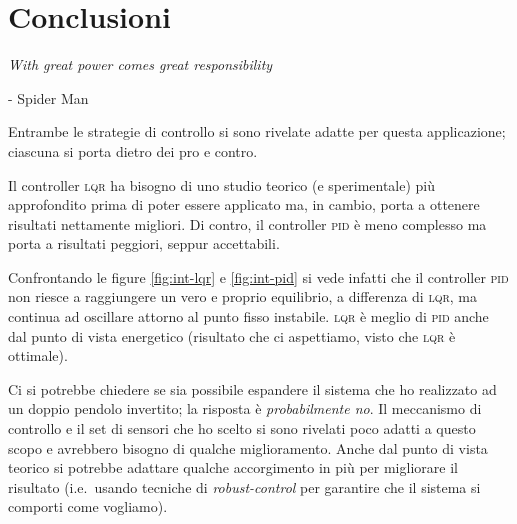\section{Conclusioni}\label{sec:conclusioni}
\begin{framed}
  \begin{flushleft}
  \emph{With great power comes great responsibility}
  \end{flushleft}
  \begin{flushright}
    - Spider Man
  \end{flushright}
\end{framed}

Entrambe le strategie di controllo si sono rivelate adatte per questa applicazione;
ciascuna si porta dietro dei pro e contro.

Il controller \textsc{lqr} ha bisogno di uno studio teorico (e sperimentale) più approfondito prima di poter essere
applicato ma, in cambio, porta a ottenere risultati nettamente migliori.
Di contro, il controller \textsc{pid} è meno complesso ma porta a risultati peggiori, seppur accettabili.

Confrontando le figure \ref{fig:int-lqr} e \ref{fig:int-pid} si vede infatti che il controller \textsc{pid} non riesce
a raggiungere un vero e proprio equilibrio, a differenza di \textsc{lqr}, ma continua ad oscillare attorno al punto
fisso instabile.
\textsc{lqr} è meglio di \textsc{pid} anche dal punto di vista energetico (risultato che ci aspettiamo, visto che \textsc{lqr} è
ottimale).

Ci si potrebbe chiedere se sia possibile espandere il sistema che ho realizzato ad un doppio pendolo invertito;
la risposta è \emph{probabilmente no}.
Il meccanismo di controllo e il set di sensori che ho scelto si sono rivelati poco adatti a questo scopo e avrebbero
bisogno di qualche miglioramento.
Anche dal punto di vista teorico si potrebbe adattare qualche accorgimento in più per migliorare il risultato (i.e.\ usando
tecniche di \emph{robust-control} per garantire che il sistema si comporti come vogliamo).
